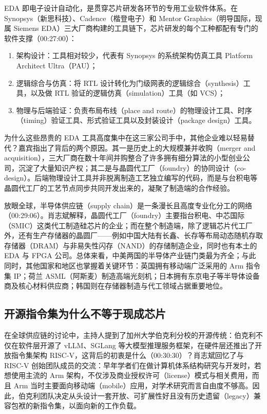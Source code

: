 \documentclass[UTF8,a4paper,11pt,fontset=fandol]{ctexart}
\begin{document}
EDA 即电子设计自动化，是贯穿芯片研发各环节的专用工业软件体系。在 Synopsys（新思科技）、Cadence（楷登电子）和 Mentor Graphics（明导国际，现属 Siemens EDA）三大厂商构建的工具链下，芯片研发的每个工种都配有专门的软件支撑（00:27:00）：
\begin{enumerate}
\item 架构设计：工具相对较少，代表有 Synopsys 的系统架构仿真工具 Platform Architect Ultra（PAU）；
\item 逻辑综合与仿真：将 RTL 设计转化为门级网表的逻辑综合（synthesis）工具，以及做 RTL 验证的逻辑仿真（simulation）工具（如 VCS）；
\item 物理与后端验证：负责布局布线（place and route）的物理设计工具、时序（timing）验证工具、形式验证工具以及封装设计（package design）工具。
\end{enumerate}

为什么这些昂贵的 EDA 工具高度集中在这三家公司手中，其他企业难以轻易替代？嘉宾指出了背后的两个原因。其一是历史上的大规模兼并收购（merger and acquisition），三大厂商在数十年间并购整合了许多拥有细分算法的小型创业公司，沉淀了大量知识产权；其二是与晶圆代工厂（foundry）的协同设计（co-design）。后端物理设计工具并非脱离制造工艺独立编写的代码，而是与台积电等晶圆代工厂的工艺节点同步共同开发出来的，凝聚了制造端的合作经验。

放眼全球，半导体供应链（supply chain）是一条漫长且高度专业化分工的网络（00:29:06）。肖志斌解释，晶圆代工厂（foundry）主要指台积电、中芯国际（SMIC）这类代工制造硅芯片的企业；而在整个制造端，除了逻辑芯片代工厂外，还有生产存储器的晶圆厂——例如中国大陆有长鑫、长存等布局动态随机存取存储器（DRAM）与非易失性闪存（NAND）的存储制造企业，同时也有本土的 EDA 与 FPGA 公司。总体来看，中美两国的半导体产业链门类最为齐全；与此同时，其他国家和地区也掌握着关键环节：英国拥有移动端广泛采用的 Arm 指令集 IP；荷兰 ASML（阿斯麦）制造高端光刻机；日本拥有东京电子等半导体设备商及核心材料供应商；韩国则在存储器制造与代工领域占据重要地位。

\subsection{开源指令集为什么不等于现成芯片}
在全球供应链的讨论中，主持人提到了加州大学伯克利分校的开源传统：伯克利不仅在软件层开源了 vLLM、SGLang 等大模型推理服务框架，在硬件层还推出了开放指令集架构 RISC-V，这背后的初衷是什么（00:30:30）？肖志斌回忆了与 RISC-V 创始团队成员的交流：早年学者们在做计算机体系结构研究与开发时，若想使用主流的 Arm 架构，不仅涉及商业授权许可（license）模式与相关费用，而且 Arm 当时主要面向移动端（mobile）应用，对学术研究而言自由度不够高。因此，伯克利团队决定从头设计一套开放、可扩展性好且没有历史遗留（legacy）兼容包袱的新指令集，以面向新的工作负载。
\end{document}

